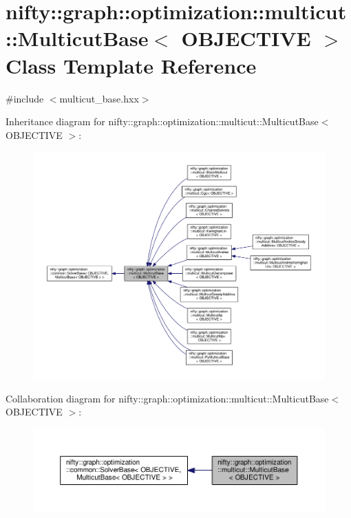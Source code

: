 \hypertarget{classnifty_1_1graph_1_1optimization_1_1multicut_1_1MulticutBase}{}\section{nifty\+:\+:graph\+:\+:optimization\+:\+:multicut\+:\+:Multicut\+Base$<$ O\+B\+J\+E\+C\+T\+I\+V\+E $>$ Class Template Reference}
\label{classnifty_1_1graph_1_1optimization_1_1multicut_1_1MulticutBase}


{\ttfamily \#include $<$multicut\+\_\+base.\+hxx$>$}



Inheritance diagram for nifty\+:\+:graph\+:\+:optimization\+:\+:multicut\+:\+:Multicut\+Base$<$ O\+B\+J\+E\+C\+T\+I\+V\+E $>$\+:\nopagebreak
\begin{figure}[H]
\begin{center}
\leavevmode
\includegraphics[width=350pt]{classnifty_1_1graph_1_1optimization_1_1multicut_1_1MulticutBase__inherit__graph}
\end{center}
\end{figure}


Collaboration diagram for nifty\+:\+:graph\+:\+:optimization\+:\+:multicut\+:\+:Multicut\+Base$<$ O\+B\+J\+E\+C\+T\+I\+V\+E $>$\+:\nopagebreak
\begin{figure}[H]
\begin{center}
\leavevmode
\includegraphics[width=350pt]{classnifty_1_1graph_1_1optimization_1_1multicut_1_1MulticutBase__coll__graph}
\end{center}
\end{figure}
